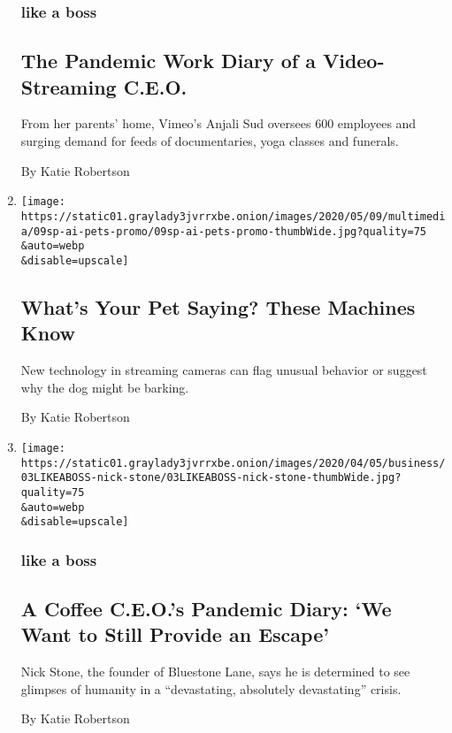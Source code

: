 \begin{enumerate}
  \hypertarget{like-a-boss}{%
  \subsubsection{like a boss}\label{like-a-boss}}

  \hypertarget{the-pandemic-work-diary-of-a-video-streaming-ceo}{%
  \subsection{The Pandemic Work Diary of a Video-Streaming
  C.E.O.}\label{the-pandemic-work-diary-of-a-video-streaming-ceo}}

  From her parents' home, Vimeo's Anjali Sud oversees 600 employees and
  surging demand for feeds of documentaries, yoga classes and funerals.

  By Katie Robertson
\item
  \href{/2020/04/08/technology/ai-pets-apps.html}{}

  \texttt{[image: https://static01.graylady3jvrrxbe.onion/images/2020/05/09/multimedia/09sp-ai-pets-promo/09sp-ai-pets-promo-thumbWide.jpg?quality=75\\\&auto=webp\\\&disable=upscale]}

  \hypertarget{whats-your-pet-saying-these-machines-know}{%
  \subsection{What's Your Pet Saying? These Machines
  Know}\label{whats-your-pet-saying-these-machines-know}}

  New technology in streaming cameras can flag unusual behavior or
  suggest why the dog might be barking.

  By Katie Robertson
\item
  \href{/2020/04/03/business/bluestone-lane-nick-stone.html}{}

  \texttt{[image: https://static01.graylady3jvrrxbe.onion/images/2020/04/05/business/03LIKEABOSS-nick-stone/03LIKEABOSS-nick-stone-thumbWide.jpg?quality=75\\\&auto=webp\\\&disable=upscale]}

  \hypertarget{like-a-boss-1}{%
  \subsubsection{like a boss}\label{like-a-boss-1}}

  \hypertarget{a-coffee-ceos-pandemic-diary-we-want-to-still-provide-an-escape}{%
  \subsection{A Coffee C.E.O.'s Pandemic Diary: `We Want to Still
  Provide an
  Escape'}\label{a-coffee-ceos-pandemic-diary-we-want-to-still-provide-an-escape}}

  Nick Stone, the founder of Bluestone Lane, says he is determined to
  see glimpses of humanity in a ``devastating, absolutely devastating''
  crisis.

  By Katie Robertson
\end{enumerate}

